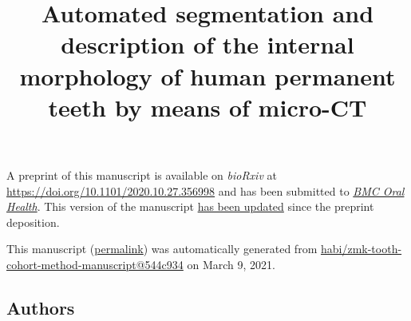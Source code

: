 \documentclass[
  american,
]{article}
\title{Automated segmentation and description of the internal morphology of human permanent teeth by means of micro-CT}
\author{}
\date{}
\begin{document}
\maketitle

A preprint of this manuscript is available on \emph{bioRxiv} at \url{https://doi.org/10.1101/2020.10.27.356998} and has been submitted to \href{https://bmcoralhealth.biomedcentral.com/}{\emph{BMC Oral Health}}.
This version of the manuscript \href{https://github.com/habi/zmk-tooth-cohort-method-manuscript/compare/f9b3333c625228f4f28211a34f381b9f87c430b0...544c934c122c7dc4c17a91fa0ac65fd48d5d80ea}{has been updated} since the preprint deposition.

This manuscript
(\href{https://habi.github.io/zmk-tooth-cohort-method-manuscript/v/544c934c122c7dc4c17a91fa0ac65fd48d5d80ea/}{permalink})
was automatically generated
from \href{https://github.com/habi/zmk-tooth-cohort-method-manuscript/tree/544c934c122c7dc4c17a91fa0ac65fd48d5d80ea}{habi/zmk-tooth-cohort-method-manuscript@544c934}
on March 9, 2021.

\hypertarget{authors}{%
\subsection{Authors}\label{authors}}
\end{document}
